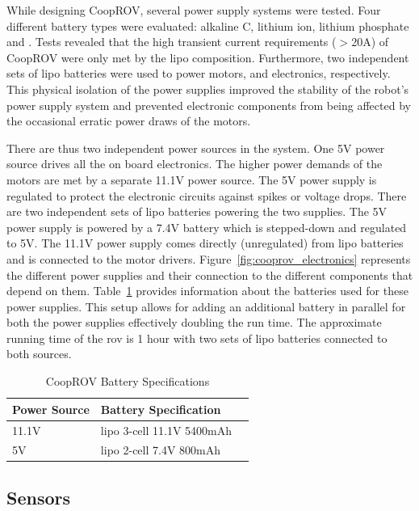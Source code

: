 \documentclass {udthesis}
\begin{document}
While designing CoopROV, several power supply systems were tested. Four different battery types were evaluated: alkaline C, lithium ion, lithium phosphate and . Tests revealed that the high transient current requirements ($>$20A) of CoopROV were only met by the \gls{lipo} composition. Furthermore, two independent sets of \gls{lipo} batteries were used to power motors, and electronics, respectively. This physical isolation of the power supplies improved the stability of the robot's power supply system and prevented electronic components from being affected by the occasional erratic power draws of the motors.

There are thus two independent power sources in the system. One 5V power source drives all the on board electronics. The higher power demands of the motors are met by a separate 11.1V power source. The 5V power supply is regulated to protect the electronic circuits against spikes or voltage drops. There are two independent sets of \gls{lipo} batteries powering the two supplies. The 5V power supply is powered by a 7.4V battery which is stepped-down and regulated to 5V. The 11.1V power supply comes directly (unregulated) from \gls{lipo} batteries and is connected to the motor drivers. Figure~\ref{fig:cooprov_electronics} represents the different power supplies  and their connection to the different components that depend on them. Table~\ref{tab:cooprov_battery} provides information about the batteries used for these power supplies. This setup allows for adding an additional battery in parallel for both the power supplies effectively doubling the run time. The approximate running time of the \gls{rov} is 1 hour 
with two 
sets of \gls{lipo} batteries connected to both sources.
%
\begin{table}
\centering
\caption{CoopROV Battery Specifications}
  \begin{tabular}{lll} 
  \toprule
  Power Source	&Battery Specification\\
  \midrule
  11.1V	&\gls{lipo} 3-cell 11.1V 5400mAh\\
  5V	&\gls{lipo} 2-cell 7.4V 800mAh\\
  \bottomrule
  \end{tabular}
  \label{tab:cooprov_battery}
\end{table}


\subsection{Sensors}
\end{document}
